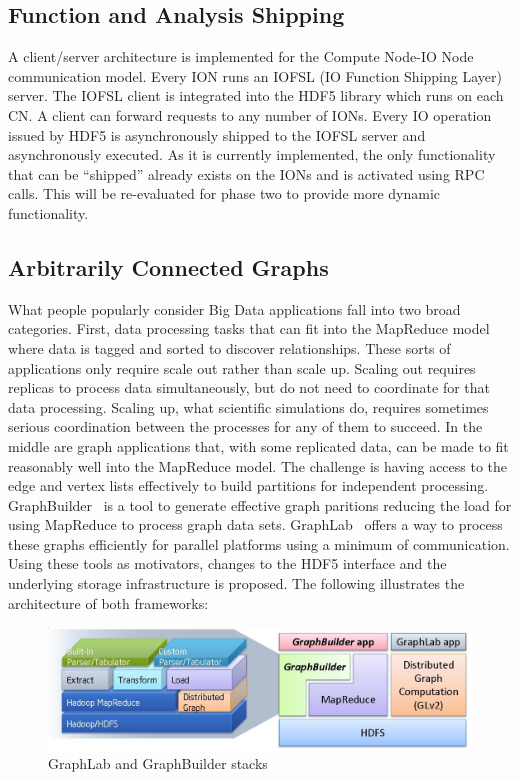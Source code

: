 \documentclass[conference]{IEEEtran}
\begin{document}
\subsection{Function and Analysis Shipping}
\label{sec:fn-shipping}

A client/server architecture is implemented for the Compute Node-IO Node
communication model.  Every ION runs an IOFSL (IO Function Shipping Layer)
server. The IOFSL client is integrated into the HDF5 library which runs on each
CN. A client can forward requests to any number of IONs. Every IO operation
issued by HDF5 is asynchronously shipped to the IOFSL server and asynchronously
executed. As it is currently implemented, the only functionality that can be
``shipped'' already exists on the IONs and is activated using RPC calls. This
will be re-evaluated for phase two to provide more dynamic functionality.

\subsection{Arbitrarily Connected Graphs}
\label{sec:acg}

What people popularly consider Big Data applications fall into two broad
categories. First, data processing tasks that can fit into the MapReduce model
where data is tagged and sorted to discover relationships. These sorts of
applications only require scale out rather than scale up. Scaling out requires
replicas to process data simultaneously, but do not need to coordinate for that
data processing. Scaling up, what scientific simulations do, requires sometimes
serious coordination between the processes for any of them to succeed. In the
middle are graph applications that, with some replicated data, can be made to
fit reasonably well into the MapReduce model. The challenge is having access to
the edge and vertex lists effectively to build partitions for independent
processing. GraphBuilder~\cite{Jain:2013:GraphBuilder} is a tool to generate
effective graph paritions reducing the load for using MapReduce to process
graph data sets. GraphLab~\cite{Low:2012:GraphLab} offers a way to process
these graphs efficiently for parallel platforms using a minimum of
communication. Using these tools as motivators, changes to the HDF5 interface
and the underlying storage infrastructure is proposed.  The following
illustrates the architecture of both frameworks:

\begin{figure}[htbp]
\centering
\vspace{-0.10in}
\includegraphics[width=\columnwidth]{images/graphlab-and-graphbuilder.png}
\vspace{-0.30in}
\caption{GraphLab and GraphBuilder stacks}
\label{fig:graphlab-graphbuilder}
\vspace{-0.10in}
\end{figure}
\end{document}
